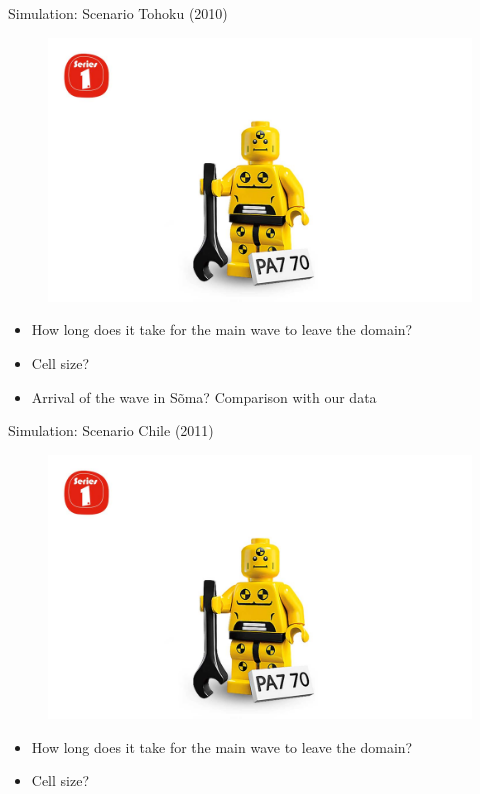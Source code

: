 \documentclass[shortpres]{beamer}
\newcommand{\imgfullscale}{0.75}
\begin{document}
\begin{frame}{Simulation: Scenario Tohoku (2010)}
	\begin{figure}
		\includegraphics[width=\imgfullscale\linewidth]{img/dummy_image.jpg}
	\end{figure}
	\begin{itemize}
		\item How long does it take for the main wave to leave the domain?
		\item Cell size?
		\item Arrival of the wave in Sõma? Comparison with our data
	\end{itemize}
\end{frame}

\begin{frame}{Simulation: Scenario Chile (2011)}
	\begin{figure}
		\includegraphics[width=\imgfullscale\linewidth]{img/dummy_image.jpg}
	\end{figure}
	\begin{itemize}
		\item How long does it take for the main wave to leave the domain?
		\item Cell size?
	\end{itemize}
\end{frame}	
	
\end{document}
